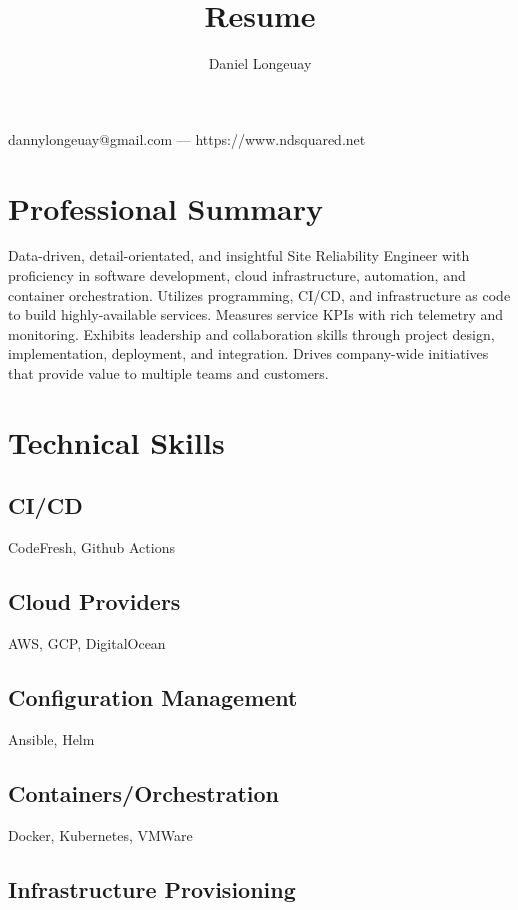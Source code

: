 \documentclass[letterpaper,11pt]{article}
\makeatletter
\renewcommand{\maketitle}{
  \begin{center}
    {\huge\bfseries\theauthor}

    \vspace{.25em}

    {dannylongeuay@gmail.com --- https://www.ndsquared.net}
  \end{center}
}
\makeatother
\begin{document}
\title{Resume}
\author{Daniel Longeuay}

\maketitle

\section{Professional Summary}

Data-driven, detail-orientated, and insightful Site Reliability Engineer with proficiency in software
development, cloud infrastructure, automation, and container orchestration. Utilizes programming, CI/CD,
and infrastructure as code to build highly-available services. Measures service KPIs with rich telemetry
and monitoring. Exhibits leadership and collaboration skills through project design, implementation, 
deployment, and integration. Drives company-wide initiatives that provide value to multiple teams and customers.

\section{Technical Skills}

\subsection{CI/CD}

CodeFresh, Github Actions

\subsection{Cloud Providers}

AWS, GCP, DigitalOcean

\subsection{Configuration Management}

Ansible, Helm

\subsection{Containers/Orchestration}

Docker, Kubernetes, VMWare

\subsection{Infrastructure Provisioning}
\end{document}
